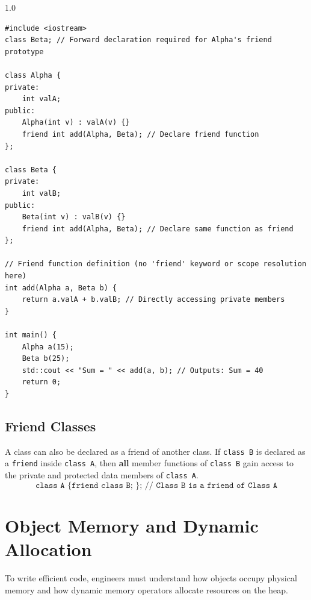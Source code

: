 \documentclass[12pt,a4paper]{article}
\begin{document}
\begin{tcolorbox}[examplebox, title={Code Example: Friend Function accessing private variables of two classes}]
\begin{spacing}{1.0}
\begin{verbatim}
#include <iostream>
class Beta; // Forward declaration required for Alpha's friend prototype

class Alpha {
private:
    int valA;
public:
    Alpha(int v) : valA(v) {}
    friend int add(Alpha, Beta); // Declare friend function
};

class Beta {
private:
    int valB;
public:
    Beta(int v) : valB(v) {}
    friend int add(Alpha, Beta); // Declare same function as friend
};

// Friend function definition (no 'friend' keyword or scope resolution here)
int add(Alpha a, Beta b) {
    return a.valA + b.valB; // Directly accessing private members
}

int main() {
    Alpha a(15);
    Beta b(25);
    std::cout << "Sum = " << add(a, b); // Outputs: Sum = 40
    return 0;
}
\end{verbatim}
\end{spacing}
\end{tcolorbox}

\subsection{Friend Classes}
A class can also be declared as a friend of another class. If \texttt{class B} is declared as a \texttt{friend} inside \texttt{class A}, then \textbf{all} member functions of \texttt{class B} gain access to the private and protected data members of \texttt{class A}.
\begin{equation}
  \texttt{class A \{ friend class B; \}; // Class B is a friend of Class A}
\end{equation}

\section{Object Memory and Dynamic Allocation}

To write efficient code, engineers must understand how objects occupy physical memory and how dynamic memory operators allocate resources on the heap.
\end{document}
